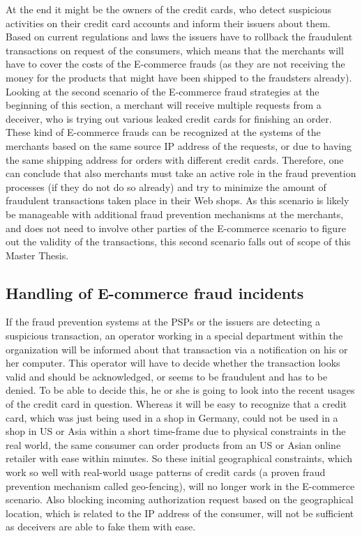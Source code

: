 At the end it might be the owners of the credit cards, who detect suspicious activities on their credit card accounts and inform their issuers about them. Based on current regulations and laws the issuers have to rollback the fraudulent transactions on request of the consumers, which means that the merchants will have to cover the costs of the \gls{E-commerce} frauds (as they are not receiving the money for the products that might have been shipped to the fraudsters already). \\

Looking at the second scenario of the \gls{E-commerce} fraud strategies at the beginning of this section, a merchant will receive multiple requests from a deceiver, who is trying out various leaked credit cards for finishing an order. These kind of \gls{E-commerce} frauds can be recognized at the systems of the merchants based on the same source \gls{IP} address of the requests, or due to having the same shipping address for orders with different credit cards. Therefore, one can conclude that also merchants must take an active role in the fraud prevention processes (if they do not do so already) and try to minimize the amount of fraudulent transactions taken place in their Web shops. As this scenario is likely be manageable with additional fraud prevention mechanisms at the merchants, and does not need to involve other parties of the \gls{E-commerce} scenario to figure out the validity of the transactions, this second scenario falls out of scope of this Master Thesis.


\subsection{Handling of \gls{E-commerce} fraud incidents}
\label{subsec:e_commerce_fraud_handling}

If the fraud prevention systems at the \gls{PSP}s or the issuers are detecting a suspicious transaction, an operator working in a special department within the organization will be informed about that transaction via a notification on his or her computer. This operator will have to decide whether the transaction looks valid and should be acknowledged, or seems to be fraudulent and has to be denied. To be able to decide this, he or she is going to look into the recent usages of the credit card in question. Whereas it will be easy to recognize that a credit card, which was just being used in a shop in Germany, could not be used in a shop in US or Asia within a short time-frame due to physical constraints in the real world, the same consumer can order products from an US or Asian online retailer with ease within minutes. So these initial geographical constraints, which work so well with real-world usage patterns of credit cards (a proven fraud prevention mechanism called geo-fencing), will no longer work in the \gls{E-commerce} scenario. Also blocking incoming authorization request based on the geographical location, which is related to the \gls{IP} address of the consumer, will not be sufficient as deceivers are able to fake them with ease. \\

